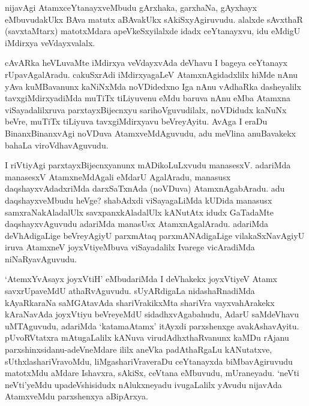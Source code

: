 \begin{artha}
nijavAgi AtamxceYtanayxveMbudu gArxhaka, garxhaNa, gAyxhayx eMbuvudakUkx BAva matutx aBAvakUkx sAkiSxyAgiruvudu. alalxde sAvxthaR (savxtaMtarx) matotxMdara apeVkeSxyilalxde idadx ceYtanayxvu, idu eMdigU iMdirxya veVdayxvalalx. 
\end{artha}


\begin{artha}
cAvARka heVLuvaMte iMdirxya veVdayxvAda deVhavu I bageya ceYtanayx rUpavAgalAradu. cakuSxrAdi iMdirxyagaLeV AtamxnAgidadxlilx hiMde nAnu yAva kuMBavanunx kaNiNxMda noVDidedxno Iga nAnu vAdhaRka dasheyalilx tavxgiMdirxyadiMda muTiTx tiLiyuvenu eMdu baruva nAnu eMba Atamxna viSayadalilxruva parxtayxBijecnxyu sarihoVguvudilalx, noVDidudx kaNuNx beVre, muTiTx tiLiyuva tavxgiMdirxyavu beVreyAyitu. AvAga I eraDu BinanxBinanxvAgi noVDuva AtamxveMdAguvudu, adu meVlina anuBavakekx bahaLa viroVdhavAguvudu.  
\end{artha}


\begin{artha}
I riVtiyAgi parxtayxBijecnxyanunx mADikoLuLxvudu manasesxV. adariMda manasesxV AtamxneMdAgali eMdarU AgalAradu, manasusx daqshayxvAdadxriMda darxSaTxnAda (noVDuva) AtamxnAgabAradu. adu daqshayxveMbudu heVge? shabAdxdi viSayagaLiMda kUDida manasusx samxraNakAladalUlx savxpanxkAladalUlx kANutAtx idudx GaTadaMte daqshayxvAguvudu adariMda manasUsx AtamxnAgalAradu. adariMda deVhAdigaLige beVreyAgiyU parxmAtaq parxmANAdigaLige vilakaSxNavAgiyU iruva AtamxneV joyxVtiyeMbuva viSayadalilx Ivarege vicAradiMda niNaRyavAguvudu.
\end{artha}


\begin{artha}
`AtemxYvAsayx joyxVtiH' eMbudariMda I deVhakekx joyxVtiyeV Atamx savxrUpaveMdU athaRvAguvudu. sUyARdigaLa nidashaRnadiMda kAyaRkaraNa saMGAtavAda shariVrakikxMta shariVra vayxvahArakekx kAraNavAda joyxVtiyu beVreyeMdU sidadhxvAgabahudu, AdarU saMdeVhavu uMTAguvudu, adariMda `katamaAtamx' itAyxdi parxshenxge avakAshavAyitu. pUvoRVtatxra mAtugaLalilx kANuva virudAdhxthaRvanunx kaMDu rAjanu parxshinxsidanu-adeVneMdare ililx aneVka padAthaRgaLu kANutatxve, sUthxlashariVravoMdu, liMgashariVraveraDu ceYtanayxda biMbavAgiruvudu matotxMdu aMdare Ishavxra, sAkiSx, ceVtana eMbuvudu, mUraneyadu. `neVti neVti'yeMdu upadeVshisidudx nAlukxneyadu ivugaLalilx yAvudu nijavAda AtamxveMdu parxshenxya aBipArxya. 
\end{artha}

